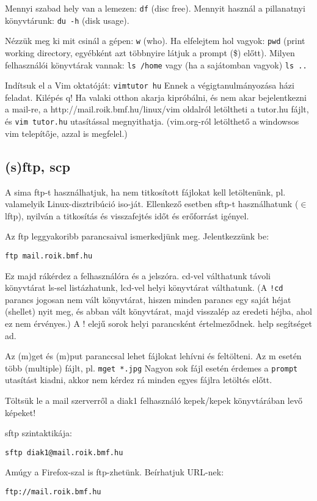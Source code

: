 \documentclass[a4paper]{article}
\newcommand{\alapcim}{http://mail.roik.bmf.hu/linux}
\newcommand{\code}{\texttt}
\begin{document}
Mennyi szabad hely van a lemezen: \code{df} (disc free). Mennyit használ
a pillanatnyi könyvtárunk: \code{du -h} (disk usage).

Nézzük meg ki mit csinál a gépen: \code{w} (who). Ha elfelejtem hol vagyok:
\code{pwd} (print working directory, egyébként azt többnyire látjuk a
prompt (\$) előtt). Milyen felhasználói könyvtárak
vannak: \code{ls /home} vagy (ha a sajátomban vagyok) \code{ls ..}

Indítsuk el a Vim oktatóját: \code{vimtutor hu}  Ennek a
végigtanulmányozása házi feladat. Kilépés q!
Ha valaki otthon akarja kipróbálni, és nem akar bejelentkezni a mail-re,
a \alapcim{}/vim oldalról letöltheti a tutor.hu
fájlt, és \code{vim tutor.hu} utasítással megnyithatja. (vim.org-ról
letölthető a windowsos vim telepítője, azzal is megfelel.)

\subsection{(s)ftp, scp}
A sima ftp-t használhatjuk, ha nem titkosított fájlokat kell
letöltenünk, pl. valamelyik Linux-disztribúció  iso-ját. Ellenkező
esetben sftp-t használhatunk ($\in$ lftp), nyilván a titkosítás és
visszafejtés időt és erőforrást igényel.

Az ftp leggyakoribb parancsaival ismerkedjünk meg. Jelentkezzünk be:
\begin{Verbatim}
ftp mail.roik.bmf.hu
\end{Verbatim}
Ez majd rákérdez a felhasználóra és a jelszóra. cd-vel válthatunk
távoli könyvtárat ls-sel listázhatunk, lcd-vel helyi könyvtárat
válthatunk. (A \code{!cd} parancs jogosan nem vált könyvtárat, hiszen
minden parancs egy saját héjat (shellet) nyit meg, és abban vált
könyvtárat, majd visszalép az eredeti héjba, ahol ez nem érvényes.) A !
elejű sorok helyi parancsként értelmeződnek. help segítséget ad.

Az (m)get és (m)put paranccsal lehet fájlokat lehívni és feltölteni. Az
m esetén több (multiple) fájlt, pl.  \code{mget *.jpg} Nagyon sok fájl
esetén érdemes a \code{prompt} utasítást kiadni, akkor nem kérdez rá
minden egyes fájlra letöltés előtt.

Töltsük le a mail szerverről a diak1 felhasználó kepek/kepek
könyvtárában levő képeket!

sftp szintaktikája:
\begin{Verbatim}
sftp diak1@mail.roik.bmf.hu
\end{Verbatim}

Amúgy a Firefox-szal is ftp-zhetünk. Beírhatjuk URL-nek:
\begin{Verbatim}
ftp://mail.roik.bmf.hu
\end{Verbatim}
\end{document}
